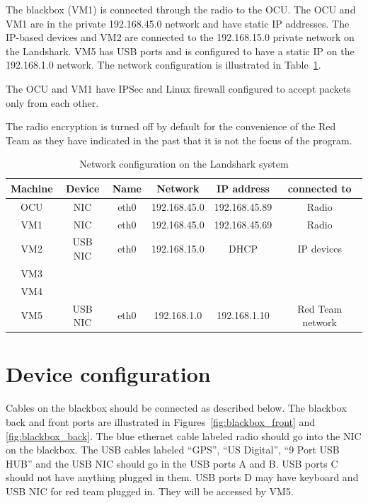 The blackbox (VM1) is connected through the radio to the OCU. The OCU and VM1 are in the
private 192.168.45.0 network and have static IP addresses. The IP-based devices and VM2 are
connected to the 192.168.15.0 private network on the Landshark. VM5 has USB ports and is
configured to have a static IP on the 192.168.1.0 network. The network configuration is
illustrated in Table~\ref{tab:network}.

The OCU and VM1 have IPSec and Linux firewall configured to accept packets only from each other.

The radio encryption is turned off by default for the convenience of the Red Team as they have
indicated in the past that it is not the focus of the program. 

\begin{table}
\footnotesize
\begin{tabular}{ |c|c|c|c|c|c| } \hline
  Machine & Device & Name & Network & IP address & connected to \\ \hline
  OCU & NIC & eth0 & 192.168.45.0 & 192.168.45.89 & Radio \\ 
  VM1 & NIC & eth0 & 192.168.45.0 & 192.168.45.69 & Radio \\ 
  VM2 & USB NIC & eth0 & 192.168.15.0 & DHCP & IP devices \\ 
  VM3 & & & & &  \\ 
  VM4 & & & & &  \\ 
  VM5 & USB NIC & eth0 & 192.168.1.0 & 192.168.1.10 & Red Team network \\ 
  \hline
\end{tabular}
\caption{Network configuration on the Landshark system}
\label{tab:network}
\end{table}

\section{Device configuration}
Cables on the blackbox should be connected as described below. The blackbox back and front ports
are illustrated in Figures~\ref{fig:blackbox_front} and \ref{fig:blackbox_back}.
The blue ethernet cable labeled radio should go into the NIC on the blackbox. 
The USB cables labeled ``GPS'', ``US Digital'', ``9 Port USB HUB'' and the USB NIC should go in the USB ports A and B. 
USB ports C should not have anything plugged in them.
USB ports D may have keyboard and USB NIC for red team plugged in. They will be accessed by VM5.

